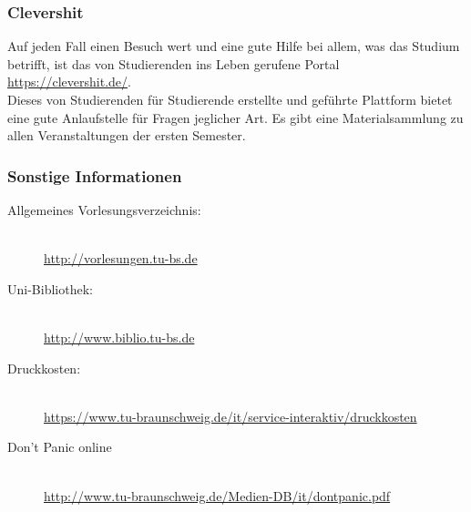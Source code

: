 	\subsubsection{Clevershit}

		Auf jeden Fall einen Besuch wert und eine gute Hilfe bei allem, was das Studium betrifft, ist das von Studierenden ins Leben gerufene Portal \mbox{\url{https://clevershit.de/}}.\\
		Dieses von Studierenden für Studierende erstellte und geführte Plattform bietet eine gute Anlaufstelle für Fragen jeglicher Art. Es gibt eine Materialsammlung zu allen Veranstaltungen der ersten Semester.

\subsubsection*{Sonstige Informationen}
	\begin{description}
		\item[Allgemeines Vorlesungsverzeichnis:] ~\\
			{\footnotesize\url{http://vorlesungen.tu-bs.de}}
		\item[Uni-Bibliothek:] ~\\
			{\footnotesize\url{http://www.biblio.tu-bs.de}}
		\item[Druckkosten:] ~\\
			{\footnotesize\url{https://www.tu-braunschweig.de/it/service-interaktiv/druckkosten}}
		\item[Don't Panic online] ~\\
			{\footnotesize\url{http://www.tu-braunschweig.de/Medien-DB/it/dontpanic.pdf}}
	\end{description}
